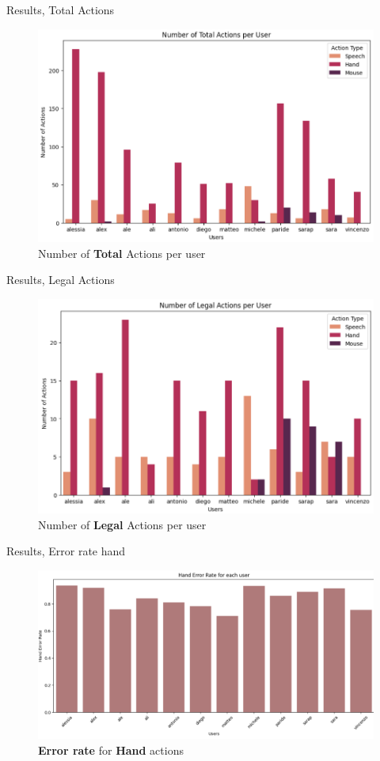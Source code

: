\documentclass[english]{beamer}
\begin{document}
\begin{frame}{Results, Total Actions}
    \begin{figure}
        \centering
        \includegraphics[width=.8\textwidth]{images/total_actions.png}
        \caption{Number of \textbf{Total} Actions per user}
    \end{figure}
\end{frame}

\begin{frame}{Results, Legal Actions}
    \begin{figure}
        \centering
        \includegraphics[width=.8\textwidth]{images/legal_actions.png}
        \caption{Number of \textbf{Legal} Actions per user}
    \end{figure}
\end{frame}

\begin{frame}{Results, Error rate hand}
    \begin{figure}
        \centering
        \includegraphics[width=.8\textwidth]{images/hand_error_rate.png}
        \caption{\textbf{Error rate} for \textbf{Hand} actions}
    \end{figure}
\end{frame}
\end{document}
